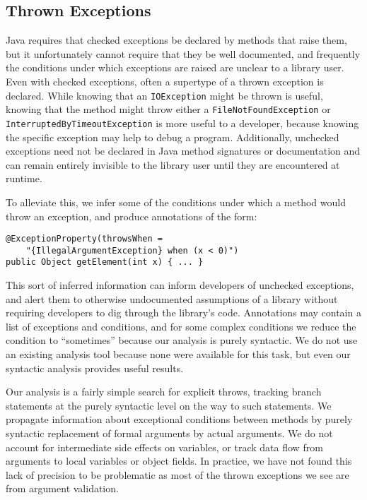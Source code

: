 \subsection{Thrown Exceptions}

Java requires that checked exceptions be declared by methods that raise them,
but it unfortunately cannot require that they be well documented, and
frequently the conditions under which exceptions are raised are unclear to a
library user. Even with checked exceptions, often a supertype of a thrown
exception is declared.  While knowing that an \texttt{IOException} might be
thrown is useful, knowing that the method might throw either a
\texttt{FileNotFoundException} or \texttt{InterruptedByTimeoutException} is more
useful to a developer, because knowing the specific exception may help to debug
a program.  Additionally, unchecked exceptions need not be declared in Java method
signatures or documentation and can remain entirely invisible to the library
user until they are encountered at runtime.

To alleviate this, we infer some of the conditions under which a method would
throw an exception, and produce annotations of the form:

\begin{verbatim}
@ExceptionProperty(throwsWhen =
    "{IllegalArgumentException} when (x < 0)")
public Object getElement(int x) { ... }
\end{verbatim}

This sort of inferred information can inform developers of unchecked exceptions,
and alert them to otherwise undocumented assumptions of a library without
requiring developers to dig through the library's code.
Annotations may contain a list of exceptions and conditions, and for some
complex conditions we reduce the condition to ``sometimes'' because our analysis
is purely syntactic.  We do not use an
existing analysis tool because none were available for this task, but even our
syntactic analysis provides useful results.

Our analysis is a fairly simple search for explicit throws, tracking branch
statements at the purely syntactic level on the
way to such statements.  We propagate information about exceptional conditions
between methods by purely syntactic replacement of formal arguments by actual
arguments.  We do not account for intermediate side effects on variables, or
track data flow from arguments to local variables or object fields.  In
practice, we have not found this lack of precision to be problematic as most of
the thrown exceptions we see are from argument validation.

